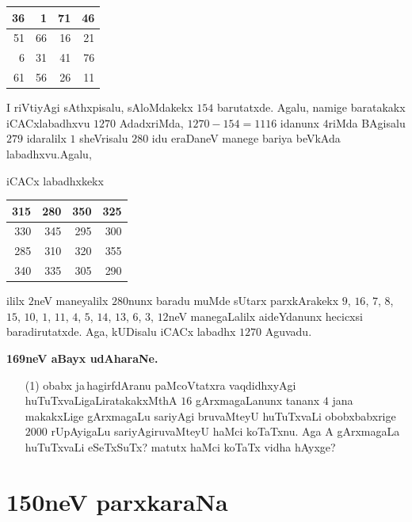 \begin{center}
\renewcommand{\arraystretch}{1.2}
\begin{tabular}{|>{\rm}r|>{\rm}r|>{\rm}r|>{\rm}r|}
\hline
36 & 1 & 71 & 46\\
\hline
51 & 66 & 16 & 21\\
\hline
6 & 31 & 41 & 76\\
\hline
61 & 56 & 26 & 11\\
\hline
\end{tabular}
\end{center}

I riVtiyAgi sAthxpisalu, sAloMdakekx $154$ barutatxde. Agalu, namige
baratakakx iCACxlabadhxvu $1270$ AdadxriMda, $1270-154=1116$ idanunx
$4$riMda BAgisalu $279$ idaralilx $1$ sheVrisalu $280$ idu eraDaneV
manege bariya beVkAda labadhxvu.\qquad Agalu,

iCACx labadhxkekx
\begin{center}
\renewcommand{\arraystretch}{1.2}
\begin{tabular}{|>{\rm}r|>{\rm}r|>{\rm}r|>{\rm}r|}
\hline
315 & 280 & 350 & 325\\
\hline
330 & 345 & 295 & 300\\
\hline
285 & 310 & 320 & 355\\
\hline
340 & 335 & 305 & 290\\
\hline
\end{tabular}
\end{center}

ililx $2$neV maneyalilx $280$nunx baradu muMde sUtarx parxkArakekx
$9$, $16$, $7$, $8$, $15$, $10$, $1$, $11$, $4$, $5$, $14$, $13$, $6$,
$3$, $12$neV manegaLalilx aideYdanunx hecicxsi baradirutatxde. Aga,
kUDisalu iCACx labadhx $1270$ Aguvadu.

\medskip
\begin{center}
{\large\bf 169neV aBayx udAharaNe.}
\end{center}

\begin{itemize}
\item[\rm(1)] obabx ja\!\,{ha}girfdAranu paMcoVtatxra vaqdidhxyAgi
huTuTxvaLigaLiratakakxMthA $16$ gArxmagaLanunx tananx $4$ jana
makakxLige gArxmagaLu sariyAgi bruvaMteyU huTuTxvaLi obobxbabxrige
$2000$ rUpAyigaLu sariyAgiruvaMteyU haMci koTaTxnu. Aga A gArxmagaLa
huTuTxvaLi eSeTxSuTx? matutx haMci koTaTx vidha hAyxge?
\end{itemize}


\chapter{150neV parxkaraNa}

